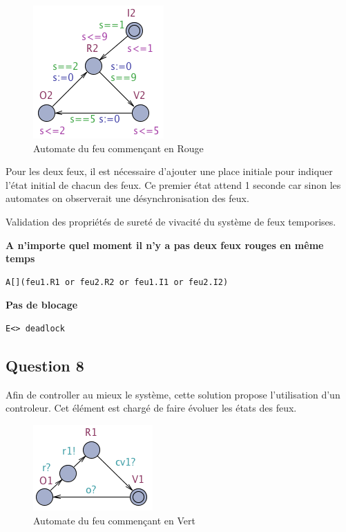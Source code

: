 \documentclass[11pt]{article}
\begin{document}
\begin{figure}[H]
	\centering
	\includegraphics{ressources/part2/Q7-2.png}
	\caption{Automate du feu commençant en Rouge}
\end{figure}

Pour les deux feux, il est nécessaire d'ajouter une place initiale pour indiquer l'état initial de chacun des feux. Ce premier état attend 1 seconde car sinon les automates on observerait une désynchronisation des feux.

Validation des propriétés de sureté de vivacité du système de feux temporises.

\textbf{A n'importe quel moment il n'y a pas deux feux rouges en même temps}
\begin{verbatim}
A[](feu1.R1 or feu2.R2 or feu1.I1 or feu2.I2)
\end{verbatim}

\textbf{Pas de blocage}
\begin{verbatim}
E<> deadlock
\end{verbatim}

\subsection{Question 8}

Afin de controller au mieux le système, cette solution propose l'utilisation d'un controleur. Cet élément est chargé de faire évoluer les états des feux. 

\begin{figure}[H]
	\centering
	\includegraphics{ressources/part2/Q8-1.png}
	\caption{Automate du feu commençant en Vert}
\end{figure}
\end{document}
